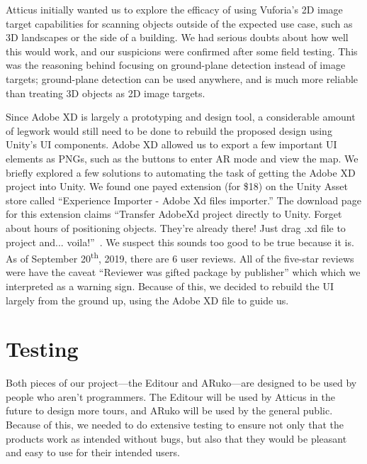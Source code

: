 \documentclass[a4paper, 10pt, american, titlepage]{article}
\begin{document}
Atticus initially wanted us to explore the efficacy of using Vuforia's 2D image
target capabilities for scanning objects outside of the expected use case, such
as 3D landscapes or the side of a building. We had serious doubts about how
well this would work, and our suspicions were confirmed after some field
testing. This was the reasoning behind focusing on ground-plane detection
instead of image targets; ground-plane detection can be used anywhere, and is
much more reliable than treating 3D objects as 2D image targets.

Since Adobe XD is largely a prototyping and design tool, a considerable amount
of legwork would still need to be done to rebuild the proposed design using
Unity's UI components. Adobe XD allowed us to export a few important UI
elements as PNGs, such as the buttons to enter AR mode and view the map. We
briefly explored a few solutions to automating the task of getting the Adobe XD
project into Unity. We found one payed extension (for \$18) on the Unity Asset
store called ``Experience Importer - Adobe Xd files importer.'' The download
page for this extension claims ``Transfer AdobeXd project directly to Unity.
Forget about hours of positioning objects. They're already there! Just drag .xd
file to project and...  voila!''~\autocite{glasseye2019}.  We suspect this
sounds too good to be true because it is. As of September
20\textsuperscript{th}, 2019, there are 6 user reviews. All of the five-star
reviews were have the caveat ``Reviewer was gifted package by publisher'' which
which we interpreted as a warning sign. Because of this, we decided to rebuild
the UI largely from the ground up, using the Adobe XD file to guide us.

\clearpage

\section{Testing}
\label{sec:testing}

Both pieces of our project---the Editour and ARuko---are designed to be used by
people who aren't programmers. The Editour will be used by Atticus in the future
to design more tours, and ARuko will be used by the general public. Because of
this, we needed to do extensive testing to ensure not only that the products
work as intended without bugs, but also that they would be pleasant and easy to
use for their intended users.

\nocite{harvey2002} %
\end{document}
